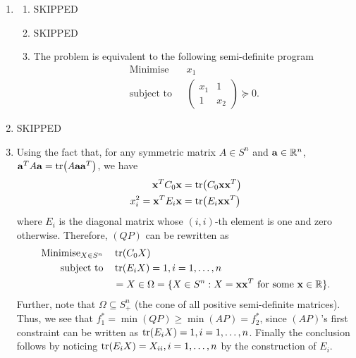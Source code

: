 \begin{enumerate}
    \item \begin{enumerate}[label=(\arabic*)]
              \item {\color{red} SKIPPED}
              \item {\color{red} SKIPPED}
              \item The problem is equivalent to the following semi-definite program
                    \begin{align*}
                        \text{Minimise} \quad & x_1                                    \\
                        \text{subject to}     & \begin{pmatrix}
                            x_1 & 1 \\ 1 & x_2
                        \end{pmatrix} \succeq 0.
                    \end{align*}
          \end{enumerate}
    \item {\color{red} SKIPPED}
    \item Using the fact that, for any symmetric matrix \(A \in S^n\) and \(\mathbf{a} \in \mathbb{R}^n\), \(\mathbf{a}^T A \mathbf{a} = \tr(A\mathbf{a}\mathbf{a}^T)\), we have
          \begin{align*}
              \mathbf{x}^T C_0 \mathbf{x}         & = \tr(C_0\mathbf{x}\mathbf{x}^T)  \\
              x_i^2 = \mathbf{x}^T E_i \mathbf{x} & = \tr(E_i \mathbf{x}\mathbf{x}^T)
          \end{align*}
          where \(E_i\) is the diagonal matrix whose \((i, i)\)-th element is one and zero otherwise. Therefore, \((QP)\) can be rewritten as
          \begin{align*}
              \text{Minimise}_{X \in S^n} \quad & \tr(C_0 X)                                                                   \\
              \text{subject to} \quad           & \tr(E_i X) = 1, i = 1, \dots, n                                              \\
                                                & = X \in \Omega = \{X \in S^n : X = \mathbf{x}\mathbf{x}^T \text{ for some } \mathbf{x} \in \mathbb{R}\}.
          \end{align*}
          Further, note that \(\Omega \subseteq S_+^n\) (the cone of all positive semi-definite matrices). Thus, we see that \(f_1^* = \min(QP) \geq \min(AP) = f_2^*\), since \((AP)\)'s first constraint can be written as \(\tr(E_i X) = 1, i = 1, \dots, n\). Finally the conclusion follows by noticing \(\tr(E_i X) = X_{ii}, i = 1, \dots, n\) by the construction of \(E_i\).
\end{enumerate}

